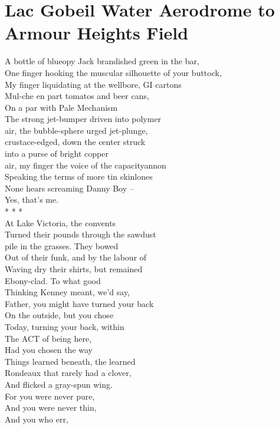 \documentclass[smalldemyvopaper,11pt,twoside,onecolumn,openright,extrafontsizes]{memoir}
\begin{document}
\chapter{Lac Gobeil Water Aerodrome to Armour Heights Field}
A bottle of blueopy Jack brandished green in the bar,
\\One finger hooking the muscular silhouette of your buttock,
\\My finger liquidating at the wellbore, GI cartons
\\Mul-che en part tomatos and beer cans,
\\On a par with Pale Mechanism
\\The strong jet-bumper driven into polymer
\\air, the bubble-sphere urged jet-plunge,
\\crustace-edged, down the center struck
\\into a purse of bright copper
\\air, my finger the voice of the capacityannon
\\Speaking the terms of more tin skinlones
\\None hears screaming Danny Boy --
\\Yes, that's me.
\\*   *   *
\\At Lake Victoria, the convents
\\Turned their pounds through the sawdust
\\pile in the grasses. They bowed
\\Out of their funk, and by the labour of
\\Waving dry their shirts, but remained
\\Ebony-clad. To what good
\\Thinking Kenney meant, we'd say,
\\Father, you might have turned your back
\\On the outside, but you chose
\\Today, turning your back, within
\\The ACT of being here,
\\Had you chosen the way
\\Things learned beneath, the learned
\\Rondeaux that rarely had a clover,
\\And flicked a gray-spun wing.
\\For you were never pure,
\\And you were never thin,
\\And you who err,
\end{document}
